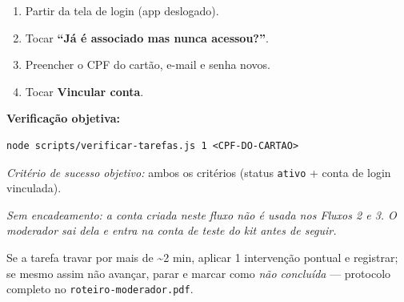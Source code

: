 \documentclass[11pt,a4paper]{article}
\newcommand{\criterio}[1]{\noindent\textit{Critério de sucesso objetivo:} #1}
\begin{document}
\begin{enumerate}[leftmargin=6mm]
  \item Partir da tela de login (app deslogado).
  \item Tocar \textbf{``Já é associado mas nunca acessou?''}.
  \item Preencher o CPF do cartão, e-mail e senha novos.
  \item Tocar \textbf{Vincular conta}.
\end{enumerate}

\textbf{Verificação objetiva:}
\begin{verbatim}
node scripts/verificar-tarefas.js 1 <CPF-DO-CARTAO>
\end{verbatim}
\criterio{ambos os critérios (status \texttt{ativo} + conta de login vinculada).}

\vspace{2mm}
\noindent\textit{Sem encadeamento: a conta criada neste fluxo não é usada nos Fluxos 2 e 3. O
moderador sai dela e entra na conta de teste do kit antes de seguir.}

\vfill
\noindent\footnotesize Se a tarefa travar por mais de \textasciitilde2 min, aplicar 1 intervenção
pontual e registrar; se mesmo assim não avançar, parar e marcar como \textit{não concluída} ---
protocolo completo no \texttt{roteiro-moderador.pdf}.
\end{document}
